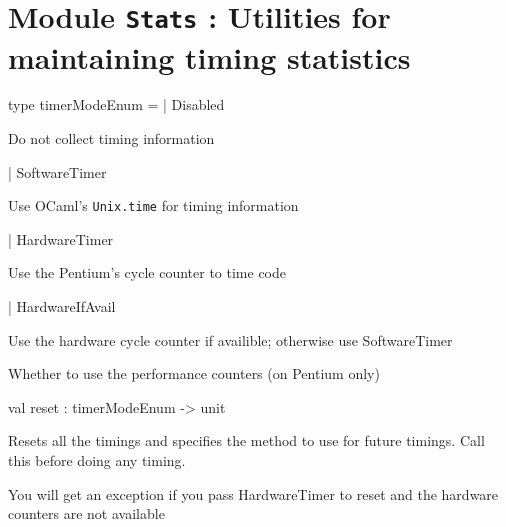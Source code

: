 \documentclass[11pt]{article}
\begin{document}
\section{Module {\tt{Stats}} : Utilities for maintaining timing statistics}
\label{module:Stats}




\ocamldocvspace{0.5cm}



\label{type:Stats.timerModeEnum}\begin{ocamldoccode}
type timerModeEnum =
  | Disabled
\end{ocamldoccode}
\begin{ocamldoccomment}
Do not collect timing information
\end{ocamldoccomment}
\begin{ocamldoccode}
  | SoftwareTimer
\end{ocamldoccode}
\begin{ocamldoccomment}
Use OCaml's {\tt{Unix.time}} for timing information
\end{ocamldoccomment}
\begin{ocamldoccode}
  | HardwareTimer
\end{ocamldoccode}
\begin{ocamldoccomment}
Use the Pentium's cycle counter to time code
\end{ocamldoccomment}
\begin{ocamldoccode}
  | HardwareIfAvail
\end{ocamldoccode}
\begin{ocamldoccomment}
Use the hardware cycle counter if availible; 
                        otherwise use SoftwareTimer
\end{ocamldoccomment}
\begin{ocamldocdescription}
Whether to use the performance counters (on Pentium only)


\end{ocamldocdescription}




\label{val:Stats.reset}\begin{ocamldoccode}
val reset : timerModeEnum -> unit
\end{ocamldoccode}
\begin{ocamldocdescription}
Resets all the timings and specifies the method to use for future timings.
  Call this before doing any timing.


 You will get an exception if you pass HardwareTimer to reset and the
 hardware counters are not available


\end{ocamldocdescription}
\end{document}
